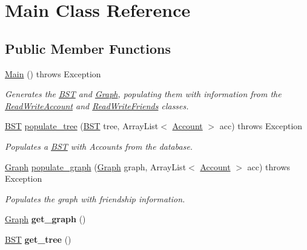 \hypertarget{class_main}{}\section{Main Class Reference}
\label{class_main}
\subsection*{Public Member Functions}
\begin{DoxyCompactItemize}
\item 
\mbox{\label{class_main_a86df60b74e5d667547357dc7935b4b70}} 
\hyperlink{class_main_a86df60b74e5d667547357dc7935b4b70}{Main} ()  throws Exception     
\begin{DoxyCompactList}\small\item\em Generates the \hyperlink{class_b_s_t}{B\+ST} and \hyperlink{class_graph}{Graph}, populating them with information from the \hyperlink{class_read_write_account}{Read\+Write\+Account} and \hyperlink{class_read_write_friends}{Read\+Write\+Friends} classes. \end{DoxyCompactList}\item 
\mbox{\label{class_main_a61851ea3ba57eaaff107ae9e3c053f2e}} 
\hyperlink{class_b_s_t}{B\+ST} \hyperlink{class_main_a61851ea3ba57eaaff107ae9e3c053f2e}{populate\+\_\+tree} (\hyperlink{class_b_s_t}{B\+ST} tree, Array\+List$<$ \hyperlink{class_account}{Account} $>$ acc)  throws Exception     
\begin{DoxyCompactList}\small\item\em Populates a \hyperlink{class_b_s_t}{B\+ST} with Accounts from the database. \end{DoxyCompactList}\item 
\hyperlink{class_graph}{Graph} \hyperlink{class_main_a5fd22f13b47ed4f7f56283461f2d8738}{populate\+\_\+graph} (\hyperlink{class_graph}{Graph} graph, Array\+List$<$ \hyperlink{class_account}{Account} $>$ acc)  throws Exception     
\begin{DoxyCompactList}\small\item\em Populates the graph with friendship information. \end{DoxyCompactList}\item 
\mbox{\label{class_main_a42d61a73dcc88d218eb16a9e72dd77b1}} 
\hyperlink{class_graph}{Graph} {\bfseries get\+\_\+graph} ()
\item 
\mbox{\label{class_main_a97b7b2054c74f0789a4026bacb3d308a}} 
\hyperlink{class_b_s_t}{B\+ST} {\bfseries get\+\_\+tree} ()
\end{DoxyCompactItemize}
